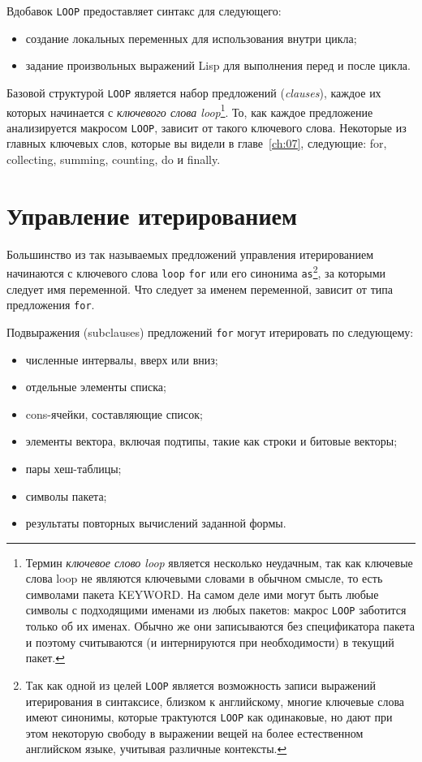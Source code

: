 Вдобавок \lstinline{LOOP} предоставляет синтакс для следующего:

\begin{itemize}
\item создание локальных переменных для использования внутри цикла;
\item задание произвольных выражений Lisp для выполнения перед и после цикла.
\end{itemize}

Базовой структурой \lstinline{LOOP} является набор предложений (\textit{clauses}), каждое их
которых начинается с \textit{ключевого слова loop}\footnote{Термин \textit{ключевое слово
    loop} является несколько неудачным, так как ключевые слова loop не являются ключевыми
  словами в обычном смысле, то есть символами пакета KEYWORD. На самом деле ими могут быть
  любые символы с подходящими именами из любых пакетов: макрос \lstinline{LOOP} заботится
  только об их именах. Обычно же они записываются без спецификатора пакета и поэтому
  считываются (и интернируются при необходимости) в текущий пакет.}\hspace{\footnotenegspace}. То, как каждое
предложение анализируется макросом \lstinline{LOOP}, зависит от такого ключевого
слова. Некоторые из главных ключевых слов, которые вы видели в главе~\ref{ch:07},
следующие: for, collecting, summing, counting, do и finally.

\section{Управление итерированием}

Большинство из так называемых предложений управления итерированием начинаются с ключевого
слова \lstinline{loop} \lstinline{for} или его синонима \lstinline{as}\footnote{Так как одной из целей
  \lstinline{LOOP} является возможность записи выражений итерирования в синтаксисе, близком к
  английскому, многие ключевые слова имеют синонимы, которые трактуются \lstinline{LOOP} как
  одинаковые, но дают при этом некоторую свободу в выражении вещей на более естественном
  английском языке, учитывая различные контексты.}\hspace{\footnotenegspace}, за которыми следует имя переменной. Что
следует за именем переменной, зависит от типа предложения \lstinline{for}.

Подвыражения (subclauses) предложений \lstinline{for} могут итерировать по следующему:
\begin{itemize}
\item численные интервалы, вверх или вниз;
\item отдельные элементы списка;
\item cons-ячейки, составляющие список;
\item элементы вектора, включая подтипы, такие как строки и битовые векторы;
\item пары хеш-таблицы;
\item символы пакета;
\item результаты повторных вычислений заданной формы.
\end{itemize}

